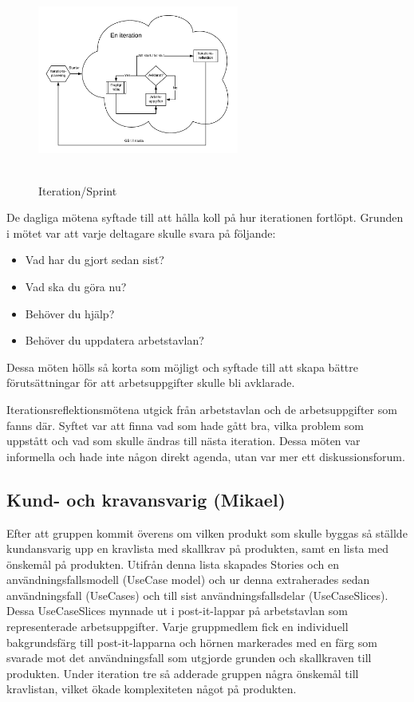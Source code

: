 \documentclass[conference]{IEEEtran}
\begin{document}
\begin{figure}[h!tbp]
    \centerline{\includegraphics[max height=250px, max width=250px]{images/iteration.pdf}}
    \caption{Iteration/Sprint}
    \label{fig:iteration}
\end{figure}

De dagliga mötena syftade till att hålla koll på hur iterationen fortlöpt. Grunden i mötet var att varje deltagare skulle svara på följande:
\begin{itemize}
    \item Vad har du gjort sedan sist?
    \item Vad ska du göra nu?
    \item Behöver du hjälp?
    \item Behöver du uppdatera arbetstavlan?
\end{itemize}
Dessa möten hölls så korta som möjligt och syftade till att skapa bättre förutsättningar för att arbetsuppgifter skulle bli avklarade.

Iterationsreflektionsmötena utgick från arbetstavlan och de arbetsuppgifter som fanns där. Syftet var att finna vad som hade gått bra, vilka problem som uppstått och vad som skulle ändras till nästa iteration. Dessa möten var informella och hade inte någon direkt agenda, utan var mer ett diskussionsforum.

\subsection{Kund- och kravansvarig (Mikael)}
Efter att gruppen kommit överens om vilken produkt som skulle byggas så ställde kundansvarig upp en kravlista med skallkrav på produkten, samt en lista med önskemål på produkten. 
Utifrån denna lista skapades Stories och en användningsfallsmodell (UseCase model) och ur denna extraherades sedan användningsfall (UseCases) och till sist användningsfallsdelar 
(UseCaseSlices). Dessa UseCaseSlices mynnade ut i post-it-lappar på arbetstavlan som representerade arbetsuppgifter. Varje gruppmedlem fick en individuell bakgrundsfärg till 
post-it-lapparna och hörnen markerades med en färg som svarade mot det användningsfall som utgjorde grunden och skallkraven till produkten.
Under iteration tre så adderade gruppen några önskemål till kravlistan, vilket ökade komplexiteten något på produkten.     
\end{document}
